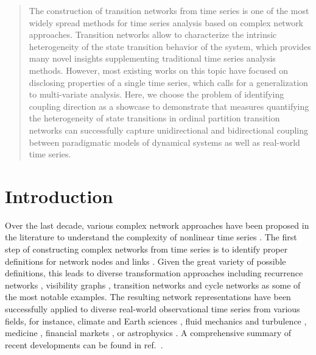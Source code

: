 \documentclass[12pt,aip,cha,reprint,nofootinbib]{revtex4-1}
\begin{document}
\maketitle

\begin{quotation} 
The construction of transition networks from time series is one of the most widely spread methods for time series analysis based on complex network approaches. Transition networks allow to characterize the intrinsic heterogeneity of the state transition behavior of the system, which provides many novel insights supplementing traditional time series analysis methods. However, most existing works on this topic have focused on disclosing properties of a single time series, which calls for a generalization to multi-variate analysis. Here, we choose the problem of identifying coupling direction as a showcase to demonstrate that measures quantifying the heterogeneity of state transitions in ordinal {\color{red}partition} transition networks can successfully capture unidirectional and bidirectional coupling between paradigmatic models of dynamical systems as well as real-world time series. 
\end{quotation}

\section{Introduction}
Over the last decade, various complex network approaches have been proposed in the literature to understand the complexity of nonlinear time series \cite{Bradley2015c,Kantz97,ZouPR2018}. The first step of constructing complex networks from time series is to identify proper definitions for network nodes and links \cite{ZouPR2018}. Given the great variety of possible definitions, this leads to diverse transformation approaches including recurrence networks \cite{Marwan2009,Donner2010NJP}, visibility graphs \cite{Lacasa2008}, transition networks \cite{Nicolis2005,McCullough2015} and cycle networks \cite{Zhang2006} as some of the most notable examples. The resulting network representations have been successfully applied to diverse real-world observational time series from various fields, for instance, climate and Earth sciences \cite{Donges2011PNAS,Elsner2009,schleussner2015indications}, fluid mechanics and turbulence \cite{Liu2009,Gorski2015,Gao2015a,Gao2016b,Manshour2015a}, medicine \cite{Ramirez2013,Subramaniyam2015}, financial markets \cite{Flanagan2016}, or astrophysics \cite{Zou2014a,Zou2014}. A comprehensive summary of recent developments can be found in ref.~\cite{ZouPR2018}.
\end{document}
